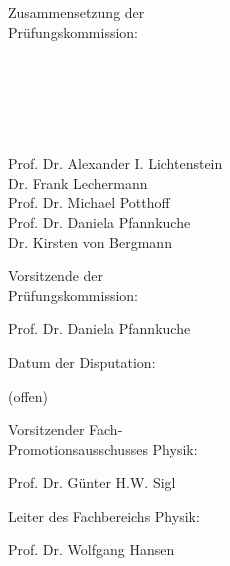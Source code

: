 \documentclass[
12pt, %
english, %
singlespacing, %
liststotoc, %
headsepline, %
]{MastersDoctoralThesis} %
\numberwithin{equation}{section}
\begin{document}
\begin{minipage}{0.43\linewidth}
Zusammensetzung der \\
Prüfungskommission: 
\, \\
\, \\
\, \\
\, \\
\, \\
\, \\
\end{minipage}
\begin{minipage}{1\linewidth}
Prof. Dr. Alexander I. Lichtenstein \\
Dr. Frank Lechermann \\
Prof. Dr. Michael Potthoff \\
Prof. Dr. Daniela Pfannkuche \\
Dr. Kirsten von Bergmann \\
\end{minipage}




\vspace{1cm}

\begin{minipage}{0.43\linewidth}
Vorsitzende der \\
Prüfungskommission:
\, \\
\end{minipage}
\begin{minipage}{1\linewidth}
Prof. Dr. Daniela Pfannkuche
\end{minipage}

\vspace{1cm}

\begin{minipage}{0.43\linewidth}
Datum der Disputation: 
\end{minipage}
\begin{minipage}{1\linewidth}
(offen)
\end{minipage}


\vspace{1cm}

\begin{minipage}{0.43\linewidth}
Vorsitzender Fach-\\
Promotionsausschusses Physik: \\
\end{minipage}
\begin{minipage}{1\linewidth}
Prof. Dr. Günter H.W. Sigl
\end{minipage}

\begin{minipage}{0.43\linewidth}
Leiter des Fachbereichs Physik: \\
\end{minipage}
\begin{minipage}{1\linewidth}
Prof. Dr. Wolfgang Hansen
\, \\
\end{minipage}
\end{document}
